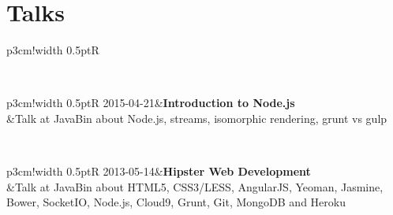\documentclass[10pt]{article}
\newcommand\VRule{\color{lightgray}\vrule width 0.5pt}
\begin{document}
\section*{Talks}
\begin{tabular}{p{3cm}!{\VRule}R}
\end{tabular}\\
\vspace{1em}
\begin{tabular}{p{3cm}!{\VRule}R}
2015-04-21&{\bf Introduction to Node.js }\\
&Talk at JavaBin about Node.js, streams, isomorphic rendering, grunt vs gulp\\
\end{tabular}\\
\vspace{2em}
\begin{tabular}{p{3cm}!{\VRule}R}
2013-05-14&{\bf Hipster Web Development }\\
&Talk at JavaBin about HTML5, CSS3/LESS, AngularJS, Yeoman, Jasmine, Bower, SocketIO, Node.js, Cloud9, Grunt, Git, MongoDB and Heroku\\
\end{tabular}\\
\vspace{2em}
 
\end{document}
